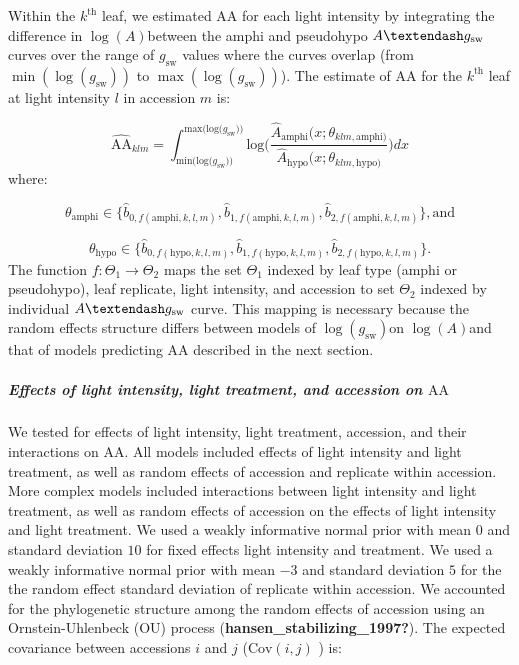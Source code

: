 \documentclass[
  letterpaper,
  DIV=11,
  numbers=noendperiod]{scrartcl}
\let\oldsubparagraph\subparagraph
\renewcommand{\subparagraph}[1]{\oldsubparagraph{#1}\mbox{}}
\newcommand{\aax}{$\mathrm{AA}$}
\newcommand{\agcurve}{$A \textendash g_\text{sw}$}
\newcommand{\gsw}{$g_\text{sw}$}
\newcommand{\loggsw}{$\log(g_\text{sw})$}
\newcommand{\logA}{$\log(A)$}
\begin{document}
Within the \(k^{\text{th}}\) leaf, we estimated \aax{} for each light
intensity by integrating the difference in \logA between the amphi and
pseudohypo \agcurve{} curves over the range of \gsw{} values where the
curves overlap (from \(\min(\log(g_\text{sw}))\) to
\(\max(\log(g_\text{sw}))\)). The estimate of \aax{} for the
\(k^{\text{th}}\) leaf at light intensity \(l\) in accession \(m\) is:

\[\widehat{\mathrm{AA}}_{klm} = \int_{\text{min(log(}g_\text{sw}))}^{\text{max(log(}g_\text{sw}))} \text{log}\bigg(\frac{\hat{A}_\text{amphi}(x; \theta_{klm,\text{amphi})}}{\hat{A}_\text{hypo}(x; \theta_{klm,\text{hypo})}}\bigg) dx\]
where:

\[\theta_\text{amphi} \in \{\hat{b}_{0, f(\text{amphi}, k,l,m)}, \hat{b}_{1, f(\text{amphi}, k,l,m)}, \hat{b}_{2, f(\text{amphi}, k,l,m)}\}, \text{and}\]

\[\theta_\text{hypo} \in \{\hat{b}_{0, f(\text{hypo}, k,l,m)}, \hat{b}_{1, f(\text{hypo}, k,l,m)}, \hat{b}_{2, f(\text{hypo}, k,l,m)}\}.\]
The function \(f : \Theta_1 \rightarrow \Theta_2\) maps the set
\(\Theta_1\) indexed by leaf type (amphi or pseudohypo), leaf replicate,
light intensity, and accession to set \(\Theta_2\) indexed by individual
\agcurve{} curve. This mapping is necessary because the random effects
structure differs between models of \loggsw on \logA and that of models
predicting \aax{} described in the next section.

\subparagraph{\texorpdfstring{Effects of light intensity, light
treatment, and accession on
\aax}{Effects of light intensity, light treatment, and accession on }}\label{effects-of-light-intensity-light-treatment-and-accession-on}

We tested for effects of light intensity, light treatment, accession,
and their interactions on \aax. All models included effects of light
intensity and light treatment, as well as random effects of accession
and replicate within accession. More complex models included
interactions between light intensity and light treatment, as well as
random effects of accession on the effects of light intensity and light
treatment. We used a weakly informative normal prior with mean \(0\) and
standard deviation \(10\) for fixed effects light intensity and
treatment. We used a weakly informative normal prior with mean \(-3\)
and standard deviation \(5\) for the the random effect standard
deviation of replicate within accession. We accounted for the
phylogenetic structure among the random effects of accession using an
Ornstein-Uhlenbeck (OU) process (\textbf{hansen\_stabilizing\_1997?}).
The expected covariance between accessions \(i\) and \(j\)
(\(\text{Cov}(i, j)\) ) is:
\end{document}
